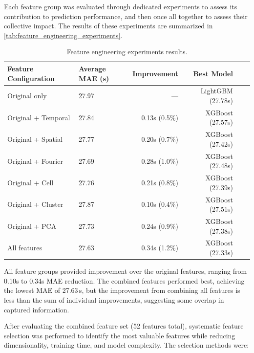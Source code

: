 Each feature group was evaluated through dedicated experiments to assess its contribution to prediction performance, and then once all together to assess their collective impact.
The results of these experiments are summarized in \autoref{tab:feature_engineering_experiments}.

\begin{table}[htbp]
    \centering
    \caption{Feature engineering experiments results.}
    \label{tab:feature_engineering_experiments}
    \begin{tabular}{llrrrr}
        \toprule
        \textbf{Feature Configuration} & \textbf{Average MAE (s)} & \textbf{Improvement} & \textbf{Best Model} \\
        \midrule
        Original only & 27.97 & — & LightGBM (27.78s) \\
        Original + Temporal & 27.84 & 0.13s (0.5\%) & XGBoost (27.57s) \\
        Original + Spatial & 27.77 & 0.20s (0.7\%) & XGBoost (27.42s) \\
        Original + Fourier & 27.69 & 0.28s (1.0\%) & XGBoost (27.48s) \\
        Original + Cell & 27.76 & 0.21s (0.8\%) & XGBoost (27.39s) \\
        Original + Cluster & 27.87 & 0.10s (0.4\%) & XGBoost (27.51s) \\
        Original + PCA & 27.73 & 0.24s (0.9\%) & XGBoost (27.38s) \\
        All features & 27.63 & 0.34s (1.2\%) & XGBoost (27.33s) \\
        \bottomrule
    \end{tabular}
\end{table}

All feature groups provided improvement over the original features, ranging from 0.10s to 0.34s MAE reduction. The combined features performed best, achieving the lowest MAE of 27.63\,s, but the improvement from combining all features is less than the sum of individual improvements, suggesting some overlap in captured information.

After evaluating the combined feature set (52 features total), systematic feature selection was performed to identify the most valuable features while reducing dimensionality, training time, and model complexity. The selection methods were:


